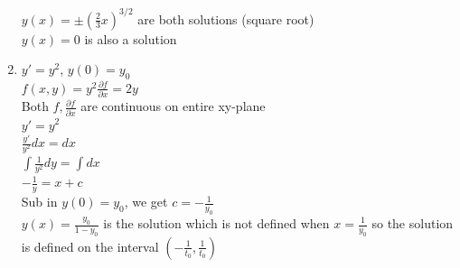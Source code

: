 \documentclass{article}
\begin{document}
\begin{enumerate}
    $y(x)=\pm(\frac{2}{3}x)^{3/2}$ are both solutions (square root)\\
    $y(x)=0$ is also a solution
    \item $y'=y^2$, $y(0)=y_0$\\
    $f(x,y)=y^2$\hspace*{0.5in}$\frac{\partial f}{\partial x}=2y$\\
    Both $f,\frac{\partial f}{\partial x}$ are continuous on entire xy-plane\\
    $y'=y^2$\\
    $\frac{y'}{y^2}dx=dx$\\
    $\int\frac{1}{y^2}dy=\int dx$\\
    $-\frac{1}{y}=x+c$\\
    Sub in $y(0)=y_0$, we get $c=-\frac{1}{y_0}$\\
    $y(x)=\frac{y_0}{1-y_0}$ is the solution which is not defined when $x=\frac{1}{y_0}$ so the solution is defined on the interval $(-\frac{1}{t_0},\frac{1}{t_0})$
\end{enumerate}
\end{document}
